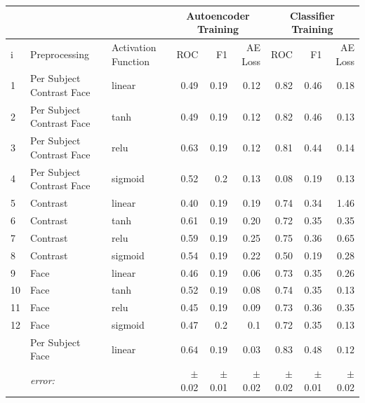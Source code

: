           \begin{table}[!h] {\footnotesize
            \centering
          \begin{tabular}{lllrrrrrr}
                && &   \multicolumn{3}{|c|}{Autoencoder Training} &  \multicolumn{3}{c|}{Classifier Training}    \\
            \hline
             i&Preprocessing    & Activation Function&  ROC&F1&AE Loss & ROC & F1 & AE Loss \\
             \hline
             1&Per Subject Contrast Face & linear &    0.49 &   0.19 &     0.12 &    0.82 &   0.46 &     0.18 \\
             2&Per Subject Contrast Face & tanh   &    0.49 &   0.19 &     0.12 &    0.82 &   0.46 &     0.13 \\
             3&Per Subject Contrast Face & relu   &    0.63 &   0.19 &     0.12 &    0.81 &   0.44 &     0.14 \\
             4& Per Subject Contrast Face & sigmoid &    0.52 &   0.2  &     0.13 &    0.08 &   0.19 &     0.13 \\
             \hline
             5&Contrast          & linear &    0.40 &   0.19 &     0.19 &    0.74 &   0.34 &     1.46 \\
             6&Contrast          & tanh   &    0.61 &   0.19 &     0.20 &    0.72 &   0.35 &     0.35 \\
             7&Contrast          & relu   &    0.59 &   0.19 &     0.25 &    0.75 &   0.36 &     0.65 \\
             8& Contrast         & sigmoid &    0.54 &   0.19 &     0.22 &    0.50    &   0.19 &     0.28 \\
             \hline
             9&Face              & linear &    0.46 &   0.19 &     0.06 &    0.73 &   0.35 &     0.26 \\
             10&Face              & tanh   &    0.52 &   0.19 &     0.08 &    0.74 &   0.35 &     0.13 \\
             11&Face              & relu   &    0.45 &   0.19 &     0.09 &    0.73 &   0.36 &     0.35 \\
             12& Face             & sigmoid &    0.47 &   0.2  &     0.1  &    0.72 &   0.35 &     0.13 \\
             \hline
             \hdashline
             13&Per Subject Face  & linear &    $0.64$ &   $0.19$ &     $0.03$ &    $0.83$ &   $0.48$ &     $0.12$ \\
             &{\it error:}  &&$\pm$0.02 &$\pm$0.01 &$\pm$0.02  &$\pm$0.02 &$\pm$0.01 &$\pm$0.02 \\

\end{tabular}}
\end{table}
